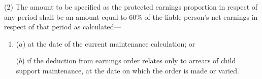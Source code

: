 \documentclass[12pt,a4paper]{article}
\begin{document}
(2) The amount to be specified as the 
protected earnings proportion  %
in respect of any period shall
be an amount equal to
60\% of the liable person’s net earnings  %
in respect of that period 
as calculated—
\begin{enumerate}\item[]
    ($a$) 
    at the date of the current maintenance calculation; or

    ($b$) 
    if the deduction from earnings order relates only to arrears of child support maintenance, at the date on which the order is made or varied.
\end{enumerate}  %

%
%
%
%
\end{document}

